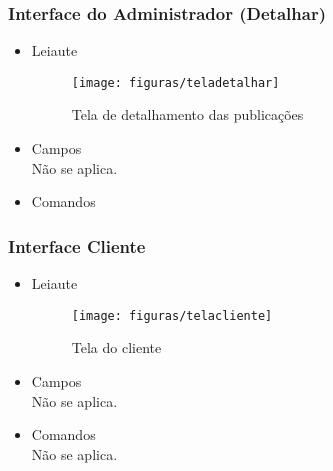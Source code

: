     \subsubsection{Interface do Administrador (Detalhar)}
        \begin{itemize}
        \item Leiaute
            \begin{figure}[H]
                \centering
                \texttt{[image: figuras/teladetalhar]}
                \caption{Tela de detalhamento das publicações}
            \end{figure}
        \item Campos\\
            Não se aplica.
        \item Comandos
            \begin{table}[H]
                \caption{Comandos da tela de detalhamento}
            \end{table}
    \end{itemize}
        
    \subsubsection{Interface Cliente}
        \begin{itemize}
        \item Leiaute
            \begin{figure}[H]
                \centering
                \texttt{[image: figuras/telacliente]}
                \caption{Tela do cliente}
            \end{figure}
        \item Campos\\
            Não se aplica.
        \item Comandos\\
            Não se aplica.
        \end{itemize}